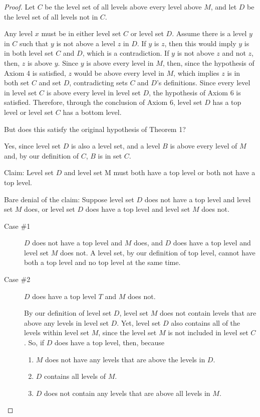 \begin{proof}
    Let $C$ be the level set of all levels above every level above $M$, and let $D$ be the level set of all levels not in $C$.

    Any level $x$ must be in either level set $C$ or level set $D$. Assume there is a level $y$ in $C$ such that $y$ is not above a level $z$ in $D$. If $y$ is $z$, then this would imply $y$ is in both level set $C$ and $D$, which is a contradiction. If $y$ is not above $z$ and not $z$, then, $z$ is above $y$. Since $y$ is above every level in $M$, then, since the hypothesis of Axiom 4 is satisfied, $z$ would be above every level in $M$, which implies $z$ is in both set $C$ and set $D$, contradicting sets $C$ and $D$'s definitions. Since every level in level set $C$ is above every level in level set $D$, the hypothesis of Axiom 6 is satisfied. Therefore, through the conclusion of Axiom 6, level set $D$ has a top level or level set $C$ has a bottom level.

    But does this satisfy the original hypothesis of Theorem 1?

    Yes, since level set $D$ is also a level set, and a level $B$ is above every level of $M$ and, by our definition of $C$, $B$ is in set $C$.

    Claim: Level set $D$ and level set M must both have a top level or both not have a top level.

    Bare denial of the claim: Suppose level set $D$ does not have a top level and level set $M$ does, or level set $D$ does have a top level and level set $M$ does not.


    \begin{description}
        \item[Case \#1] $D$ does not have a top level and $M$ does, and $D$ does have a top level and level set $M$ does not. A level set, by our definition of top level, cannot have both a top level and no top level at the same time.

        \item[Case \#2] $D$ does have a top level $T$ and $M$ does not.

        By our definition of level set $D$, level set $M$ does not contain levels that are above any levels in level set $D$. Yet, level set $D$ also contains all of the levels within level set $M$, since the level set $M$ is not included in level set $C$. So, if $D$ does have a top level, then, because

        \begin{enumerate}
            \item $M$ does not have any levels that are above the levels in $D$.
            \item $D$ contains all levels of $M$.
            \item $D$ does not contain any levels that are above all levels in $M$.
        \end{enumerate}


\end{description}
\end{proof}
